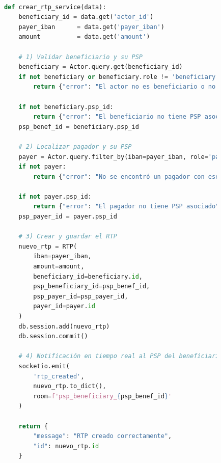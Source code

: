\begin{itemize}
       \begin{lstlisting}[language=Python, style=custom, caption={Servicio de negocio creacion RTP}]

            def crear_rtp_service(data):
                beneficiary_id = data.get('actor_id')
                payer_iban      = data.get('payer_iban')
                amount          = data.get('amount')

                # 1) Validar beneficiario y su PSP
                beneficiary = Actor.query.get(beneficiary_id)
                if not beneficiary or beneficiary.role != 'beneficiary':
                    return {"error": "El actor no es beneficiario o no existe"}

                if not beneficiary.psp_id:
                    return {"error": "El beneficiario no tiene PSP asociado"}
                psp_benef_id = beneficiary.psp_id

                # 2) Localizar pagador y su PSP
                payer = Actor.query.filter_by(iban=payer_iban, role='payer').first()
                if not payer:
                    return {"error": "No se encontró un pagador con ese IBAN"}

                if not payer.psp_id:
                    return {"error": "El pagador no tiene PSP asociado"}
                psp_payer_id = payer.psp_id

                # 3) Crear y guardar el RTP
                nuevo_rtp = RTP(
                    iban=payer_iban,
                    amount=amount,
                    beneficiary_id=beneficiary.id,
                    psp_beneficiary_id=psp_benef_id,
                    psp_payer_id=psp_payer_id,
                    payer_id=payer.id
                )
                db.session.add(nuevo_rtp)
                db.session.commit()

                # 4) Notificación en tiempo real al PSP del beneficiario
                socketio.emit(
                    'rtp_created',
                    nuevo_rtp.to_dict(),
                    room=f'psp_beneficiary_{psp_benef_id}'
                )

                return {
                    "message": "RTP creado correctamente",
                    "id": nuevo_rtp.id
                }
        \end{lstlisting}


\end{itemize}
